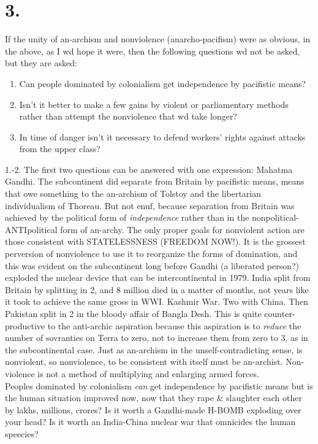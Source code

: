 \section*{3.}
If the unity of an-archism and nonviolence (anarcho-pacifism) were as obvious, in the above, as I wd hope it were, then the following questions wd not be asked, but they are asked:
\begin{enumerate}
\item Can people dominated by colonialism get independence by pacifistic means?
\item Isn't it better to make a few gains by violent or parliamentary methods rather than attempt the nonviolence that wd take longer?
\item In time of danger isn't it necessary to defend workers' rights against attacks from the upper class?
\end{enumerate}
1.-2. The first two questions can be answered with one expression: Mahatma Gandhi. The subcontinent did separate from Britain by pacifistic means, means that owe something to the an-archism of Tolstoy and the libertarian individualism of Thoreau. But not enuf, because separation from Britain was achieved by the political form of \emph{independence} rather than in the nonpolitical-ANTIpolitical form of an-archy. The only proper goals for nonviolent action are those consistent with STATELESSNESS (FREEDOM NOW!). It is the grossest perversion of nonviolence to use it to reorganize the forms of domination, and this was evident on the subcontinent long before Gandhi (a liberated person?) exploded the nuclear device that can be intercontinental in 1979. India split from Britain by splitting in 2, and 8 million died in a matter of months, not years like it took to achieve the same gross in WWI. Kashmir War. Two with China. Then Pakistan split in 2 in the bloody affair of Bangla Desh. This is quite counter-productive to the anti-archic aspiration because this aspiration is to \emph{reduce} the number of sovranties on Terra to zero, not to increase them from zero to 3, as in the subcontinental case. Just as an-archism in the unself-contradicting sense, is nonviolent, so nonviolence, to be consistent with itself must be an-archist. Non-violence is not a method of multiplying and enlarging armed forces.\\
Peoples dominated by colonialism \emph{can} get independence by pacifistic means but is the human situation improved now, now that they rape \& slaughter each other by lakhs, millions, crores? Is it worth a Gandhi-made H-BOMB exploding over your head? Is it worth an India-China nuclear war that omnicides the human speecies?\\
